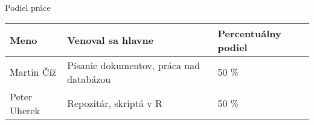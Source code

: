 \documentclass[runningheads,a4paper]{llncs}
\begin{document}
\clearpage
{\Large Podiel práce\par}

\vspace{5mm}

\begin{tabular}{|l|l|l|}
  \hline
  \textbf{Meno} & \textbf{Venoval sa hlavne} & \textbf{Percentuálny podiel} \\
  \hline
  Martin Číž & Písanie dokumentov, práca nad databázou & 50 \% \\
  \hline
  Peter Uherek & Repozitár, skriptá v R & 50 \% \\
  \hline
 \end{tabular}
\end{document}
